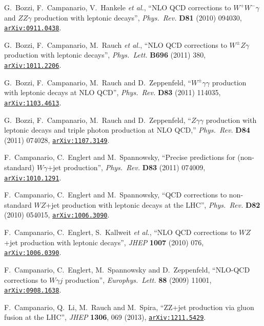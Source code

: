 \documentclass[english,12pt]{article}
\begin{document}
\begin{thebibliography}{10}
  G.~Bozzi, F.~Campanario, V.~Hankele {\it et al.},
  ``{NLO QCD corrections to $W^+W^- \gamma$ and $Z Z \gamma$ production with leptonic decays}'',
  {\em Phys.\ Rev.}  {\bf D81} (2010) 094030,
\href{https://www.arXiv.org/abs/0911.0438}{{\tt arXiv:0911.0438}}.

  G.~Bozzi, F.~Campanario, M.~Rauch  {\it et al.},
  ``NLO QCD corrections to $W^\pm Z\gamma$ production with leptonic decays'',
  {\em Phys.\ Lett.} {\bf B696} (2011) 380,
\href{https://www.arXiv.org/abs/1011.2206}{{\tt arXiv:1011.2206}}.
  
  G.~Bozzi, F.~Campanario, M.~Rauch and D.~Zeppenfeld,
  ``$W^{\pm}\gamma \gamma$ production with leptonic decays at NLO QCD'',
  {\em Phys.\ Rev.}  {\bf D83} (2011) 114035,
  \href{https://arxiv.org/abs/1103.4613}{{\tt arXiv:1103.4613}}.

  G.~Bozzi, F.~Campanario, M.~Rauch and D.~Zeppenfeld,
  ``$Z\gamma\gamma$ production with leptonic decays and triple photon production at NLO QCD,''
  {\em Phys.\ Rev.} {\bf D84} (2011) 074028,
  \href{https://arxiv.org/abs/1107.3149}{{\tt arXiv:1107.3149}}.
  
  F.~Campanario, C.~Englert and M.~Spannowsky,
  ``Precise predictions for (non-standard) $W \gamma$+jet production'',
  {\em Phys.\ Rev.}  {\bf D83} (2011) 074009,
  \href{https://arxiv.org/abs/1010.1291}{{\tt arXiv:1010.1291}}.
 
  F.~Campanario, C.~Englert and M.~Spannowsky,
  ``QCD corrections to non-standard $WZ$+jet production with leptonic decays at
  the LHC'',
  {\em Phys.\ Rev.} {\bf D82} (2010) 054015,
\href{https://www.arXiv.org/abs/1006.3090}{{\tt arXiv:1006.3090}}.
  
  F.~Campanario, C.~Englert, S.~Kallweit {\it et al.},
  ``{NLO QCD corrections to $WZ$+jet production with leptonic decays}'',
  {\em JHEP} {\bf 1007} (2010) 076,
\href{https://www.arXiv.org/abs/1006.0390}{{\tt arXiv:1006.0390}}.
   
  F.~Campanario, C.~Englert, M.~Spannowsky and D.~Zeppenfeld,
  ``NLO-QCD corrections to $W\gamma j$ production'',
  {\em Europhys.\ Lett.}  {\bf 88} (2009) 11001,
\href{https://www.arXiv.org/abs/0908.1638}{{\tt arXiv:0908.1638}}.

  F.~Campanario, Q.~Li, M.~Rauch and M.~Spira,
  ``ZZ+jet production via gluon fusion at the LHC'',
  {\em JHEP} {\bf 1306}, 069 (2013),
\href{https://www.arXiv.org/abs/1211.5429}{{\tt arXiv:1211.5429}}.


\end{thebibliography}
\end{document}
